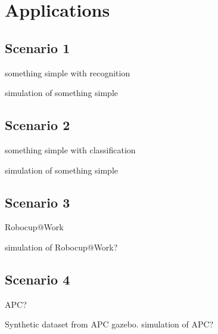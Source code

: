 
\chapter{Applications}
\label{cha:applications}


\section{Scenario 1}
\label{sec:scenario1}

something simple with recognition

simulation of something simple


\section{Scenario 2}
\label{sec:scenario2}

something simple with classification

simulation of something simple


\section{Scenario 3}
\label{sec:scenario3}

Robocup@Work

simulation of Robocup@Work?


\section{Scenario 4}
\label{sec:scenario4}

APC?

Synthetic dataset from APC gazebo.
simulation of APC?
